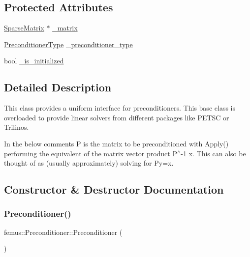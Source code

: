 \subsection*{Protected Attributes}
\begin{DoxyCompactItemize}
\item 
\mbox{\hyperlink{classfemus_1_1_sparse_matrix}{Sparse\+Matrix}} $\ast$ \mbox{\hyperlink{classfemus_1_1_preconditioner_a392c385b19a76c936fe03d6e7583f704}{\+\_\+matrix}}
\item 
\mbox{\hyperlink{_precondtype_enum_8hpp_a8b341faac6531c4543c9dc6e5e4592cf}{Preconditioner\+Type}} \mbox{\hyperlink{classfemus_1_1_preconditioner_afaadf077507ab5f48d186032f8913791}{\+\_\+preconditioner\+\_\+type}}
\item 
bool \mbox{\hyperlink{classfemus_1_1_preconditioner_afdceb4cdb6af1ec7a6da92987d98305d}{\+\_\+is\+\_\+initialized}}
\end{DoxyCompactItemize}


\subsection{Detailed Description}
This class provides a uniform interface for preconditioners. This base class is overloaded to provide linear solvers from different packages like P\+E\+T\+SC or Trilinos.

In the below comments P is the matrix to be preconditioned with Apply() performing the equivalent of the matrix vector product P$^\wedge$-\/1 x. This can also be thought of as (usually approximately) solving for Py=x. 

\subsection{Constructor \& Destructor Documentation}
\mbox{\label{classfemus_1_1_preconditioner_ab9aaed9f1302ee33c01ad345f1c3283e}} 
\subsubsection{\texorpdfstring{Preconditioner()}{Preconditioner()}}
{\footnotesize\ttfamily femus\+::\+Preconditioner\+::\+Preconditioner (\begin{DoxyParamCaption}{ }\end{DoxyParamCaption})\hspace{0.3cm}{\ttfamily [inline]}}

